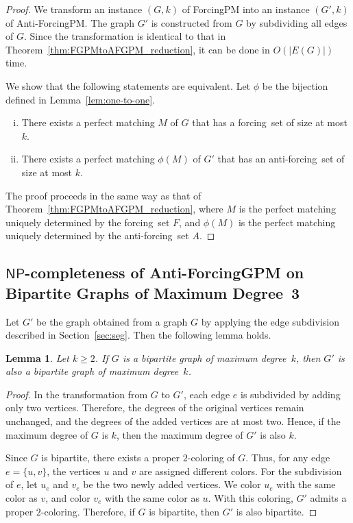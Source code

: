 \documentclass[a4paper,10pt]{article}
\newtheorem{lemma}{Lemma}
\newcommand{\NP}{$\mathsf{NP}$}
\newcommand{\FS}{\rm forcing~set}
\newcommand{\AFS}{\rm anti-forcing~set}
\newcommand{\FPM}{\sc ForcingPM} %
\newcommand{\AFPM}{\sc Anti-ForcingPM}
\begin{document}
\begin{proof}
We transform an instance $(G, k)$ of {\FPM} into an instance $(G', k)$ of {\AFPM}.
The graph $G'$ is constructed from $G$ by subdividing all edges of $G$.
Since the transformation is identical to that in Theorem~\ref{thm:FGPMtoAFGPM_reduction}, it can be done in $O(|E(G)|)$ time.

We show that the following statements are equivalent.
Let $\phi$ be the bijection defined in Lemma~\ref{lem:one-to-one}.
\begin{enumerate}[(i)]
    \item There exists a perfect matching $M$ of $G$ that has a {\FS} of size at most $k$.
    \item There exists a perfect matching $\phi(M)$ of $G'$ that has an {\AFS} of size at most $k$.
\end{enumerate}

The proof proceeds in the same way as that of Theorem~\ref{thm:FGPMtoAFGPM_reduction}, where $M$ is the perfect matching uniquely determined by the {\FS} $F$, and $\phi(M)$ is the perfect matching uniquely determined by the {\AFS} $A$.
\end{proof}

\subsection{{\NP}-completeness of {\sc\bfseries Anti-ForcingGPM} on Bipartite Graphs of Maximum Degree~3}

Let $G'$ be the graph obtained from a graph $G$ by applying the edge subdivision described in Section~\ref{sec:seg}.
Then the following lemma holds.

\begin{lemma}\label{lem:bipartite}
    Let $k \ge 2$.
    If $G$ is a bipartite graph of maximum degree~$k$, then $G'$ is also a bipartite graph of maximum degree~$k$.
\end{lemma}

\begin{proof}
    In the transformation from $G$ to $G'$, each edge $e$ is subdivided by adding only two vertices.
    Therefore, the degrees of the original vertices remain unchanged, and the degrees of the added vertices are at most two.
    Hence, if the maximum degree of $G$ is $k$, then the maximum degree of $G'$ is also $k$.

    Since $G$ is bipartite, there exists a proper $2$-coloring of $G$.
    Thus, for any edge $e=\{u,v\}$, the vertices $u$ and $v$ are assigned different colors.
    For the subdivision of $e$, let $u_e$ and $v_e$ be the two newly added vertices.
    We color $u_e$ with the same color as $v$, and color $v_e$ with the same color as $u$.
    With this coloring, $G'$ admits a proper $2$-coloring.
    Therefore, if $G$ is bipartite, then $G'$ is also bipartite.
\end{proof}
\end{document}
